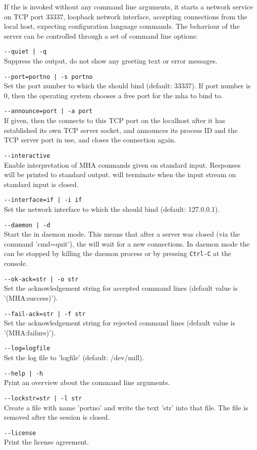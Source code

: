 If the \mhad{} is invoked without any command line arguments, it
starts a network service on TCP port 33337, loopback network interface,
accepting connections from the local host, expecting configuration language
commands.
%
The behaviour of the server can be controlled through a set of command
line options:
%
\begin{description}
\item\verb!--quiet | -q!\\Suppress the output, do not show any
greeting text or error messages.
\item\verb!--port=portno | -s portno!\\Set the port number to which
  the \mhad{} should bind (default: 33337). 
  If port number is 0, 
  then the operating system chooses a free port for the mha to bind to.
\item\verb!--announce=port | -a port!\\ If given, then the \mha{} connects to 
  this TCP port on the localhost after it has established its own TCP server 
  socket, and announces its process ID and the TCP server port in use, and
  closes the connection again. 
\item\verb!--interactive!\\Enable interpretation of MHA commands given on
  standard input. Responses will be printed to standard output. \mha{} will
  terminate when the input stream on standard input is closed.
\item\verb!--interface=if | -i if!\\Set the network interface to which
the \mhad{} should bind (default: 127.0.0.1).
\item\verb!--daemon | -d!\\Start the \mhad{} in daemon
  mode. This means that after a \mha{} server was closed (via the \mha{}
  command 'cmd=quit'), the \mhad{} will wait for a new
  connections. In daemon mode the \mhad{} can be stopped by killing
  the daemon process or by pressing {\tt Ctrl-C} at the console.
\item\verb!--ok-ack=str | -o str!\\Set the acknowledgement string for
  accepted \mha{} command lines (default value is '(MHA:success)').
\item\verb!--fail-ack=str | -f str!\\Set the acknowledgement string
  for rejected \mha{} command lines (default value is
  '(MHA:failure)').
\item\verb!--log=logfile!\\Set the log file to 'logfile'
  (default: /dev/null).
\item\verb!--help | -h!\\Print an overview about the command line
  arguments.
\item\verb!--lockstr=str | -l str!\\Create a file with name 'portno'
and write the text 'str' into that file. The file is removed after the
\mha{} session is closed.
\item\verb!--license!\\Print the license agreement.
\end{description}

